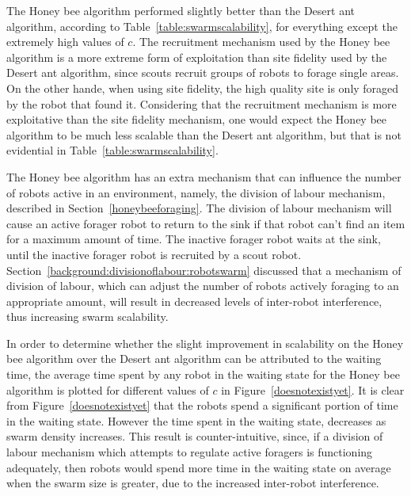 The Honey bee algorithm performed slightly better than the Desert ant algorithm, according to Table~\ref{table:swarmscalability}, for everything except the extremely high values of $c$. The recruitment mechanism used by the Honey bee algorithm is a more extreme form of exploitation than site fidelity used by the Desert ant algorithm, since scouts recruit groups of robots to forage single areas. On the other hande, when using site fidelity, the high quality site is only foraged by the robot that found it. Considering that the recruitment mechanism is more exploitative than the site fidelity mechanism, one would expect the Honey bee algorithm to be much less scalable than the Desert ant algorithm, but that is not evidential in Table~\ref{table:swarmscalability}. 

The Honey bee algorithm has an extra mechanism that can influence the number of robots active in an environment, namely, the division of labour mechanism, described in Section~\ref{honeybeeforaging}. The division of labour mechanism will cause an active forager robot to return to the sink if that robot can't find an item for a maximum amount of time. The inactive forager robot waits at the sink, until the inactive forager robot is recruited by a scout robot. Section~\ref{background:divisionoflabour:robotswarm} discussed that a mechanism of division of labour, which can adjust the number of robots actively foraging to an appropriate amount, will result in decreased levels of inter-robot interference, thus increasing swarm scalability.

In order to determine whether the slight improvement in scalability on the Honey bee algorithm over the Desert ant algorithm can be attributed to the waiting time, the average time spent by any robot in the waiting state for the Honey bee algorithm is plotted for different values of $c$ in Figure~\ref{doesnotexistyet}. It is clear from Figure~\ref{doesnotexistyet} that the robots spend a significant portion of time in the waiting state. However the time spent in the waiting state, decreases as swarm density increases. This result is counter-intuitive, since, if a division of labour mechanism which attempts to regulate active foragers is functioning adequately, then robots would spend more time in the waiting state on average when the swarm size is greater, due to the increased inter-robot interference. 


